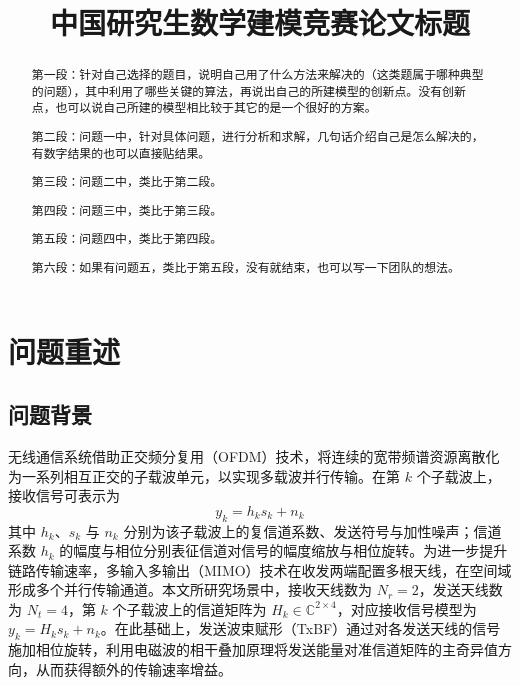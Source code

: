 \documentclass[bwprint]{gmcmthesis}
\title{中国研究生数学建模竞赛论文标题}
\numberwithin{figure}{section}
\begin{document}
 \maketitle
 \begin{abstract}
第一段：针对自己选择的题目，说明自己用了什么方法来解决的（这类题属于哪种典型的问题），其中利用了哪些关键的算法，再说出自己的所建模型的创新点。没有创新点，也可以说自己所建的模型相比较于其它的是一个很好的方案。

第二段：问题一中，针对具体问题，进行分析和求解，几句话介绍自己是怎么解决的，有数字结果的也可以直接贴结果。

第三段：问题二中，类比于第二段。

第四段：问题三中，类比于第三段。

第五段：问题四中，类比于第四段。

第六段：如果有问题五，类比于第五段，没有就结束，也可以写一下团队的想法。






\end{abstract}


\tableofcontents
\newpage

\section{问题重述}

\subsection{问题背景}

无线通信系统借助正交频分复用（OFDM）技术，将连续的宽带频谱资源离散化为一系列相互正交的子载波单元，以实现多载波并行传输。在第 $k$ 个子载波上，接收信号可表示为
\begin{equation}
	y_k = h_k s_k + n_k \label{eq:siso}
\end{equation}
其中 $h_k$、$s_k$ 与 $n_k$ 分别为该子载波上的复信道系数、发送符号与加性噪声；信道系数 $h_k$ 的幅度与相位分别表征信道对信号的幅度缩放与相位旋转。为进一步提升链路传输速率，多输入多输出（MIMO）技术在收发两端配置多根天线，在空间域形成多个并行传输通道。本文所研究场景中，接收天线数为 $N_r=2$，发送天线数为 $N_t=4$，第 $k$ 个子载波上的信道矩阵为 $H_k\in\mathbb{C}^{2\times4}$，对应接收信号模型为 $y_k=H_k s_k+n_k$。在此基础上，发送波束赋形（TxBF）通过对各发送天线的信号施加相位旋转，利用电磁波的相干叠加原理将发送能量对准信道矩阵的主奇异值方向，从而获得额外的传输速率增益。
\end{document}
